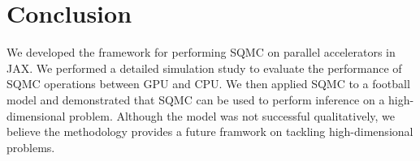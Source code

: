 \section{Conclusion}
We developed the framework for performing SQMC on parallel accelerators in JAX. We performed a detailed simulation study to evaluate the performance of SQMC operations between GPU and CPU. We then applied SQMC to a football model and demonstrated that SQMC can be used to perform inference on a high-dimensional problem. Although the model was not successful qualitatively, we believe the methodology provides a future framwork on tackling high-dimensional problems.